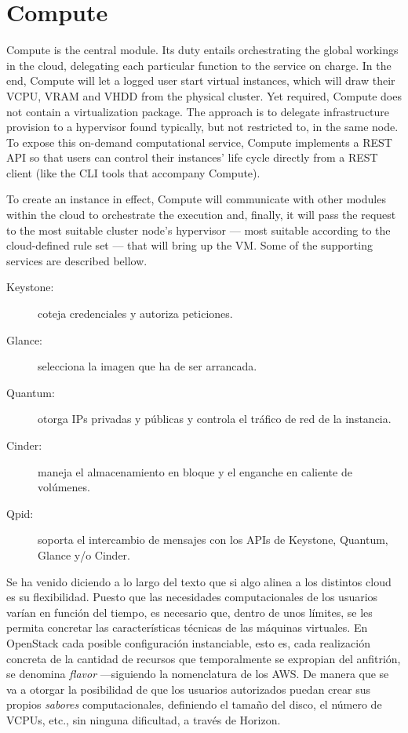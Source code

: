 \section{Compute}\label{sec:compute}

\noindent Compute is the central module. Its duty entails orchestrating the global workings in the cloud, delegating each particular function to the service on charge. In the end, Compute will let a logged user start virtual instances, which will draw their VCPU, VRAM and VHDD from the physical cluster. Yet required, Compute does not contain a virtualization package. The approach is to delegate infrastructure provision to a hypervisor found typically, but not restricted to, in the same node. To expose this on-demand computational service, Compute implements a REST API so that users can control their instances' life cycle directly from a REST client (like the CLI tools that accompany Compute).

To create an instance in effect, Compute will communicate with other modules within the cloud to orchestrate the execution and, finally, it will pass the request to the most suitable cluster node's hypervisor --- most suitable according to the cloud-defined rule set --- that will bring up the VM. Some of the supporting services are described bellow.

\begin{description}
 \item[Keystone:] coteja credenciales y autoriza peticiones.
 \item[Glance:] selecciona la imagen que ha de ser arrancada.
 \item[Quantum:] otorga IPs privadas y p\'ublicas y controla el tr\'afico de red de la instancia.
 \item[Cinder:] maneja el almacenamiento en bloque y el enganche en caliente de vol\'umenes.
 \item[Qpid:] soporta el intercambio de mensajes con los APIs de Keystone, Quantum, Glance y/o Cinder.
\end{description}

Se ha venido diciendo a lo largo del texto que si algo alinea a los distintos cloud es su flexibilidad. Puesto que las necesidades computacionales de los usuarios var\'ian en funci\'on del tiempo, es necesario que, dentro de unos l\'imites, se les permita concretar las caracter\'isticas t\'ecnicas de las m\'aquinas virtuales. En OpenStack cada posible configuraci\'on instanciable, esto es, cada realizaci\'on concreta de la cantidad de recursos que temporalmente se expropian del anfitri\'on, se denomina \emph{flavor} ---siguiendo la nomenclatura de los AWS. De manera que se va a otorgar la posibilidad de que los usuarios autorizados puedan crear sus propios \emph{sabores} computacionales, definiendo el tama\~no del disco, el n\'umero de VCPUs, etc., sin ninguna dificultad, a trav\'es de Horizon.


